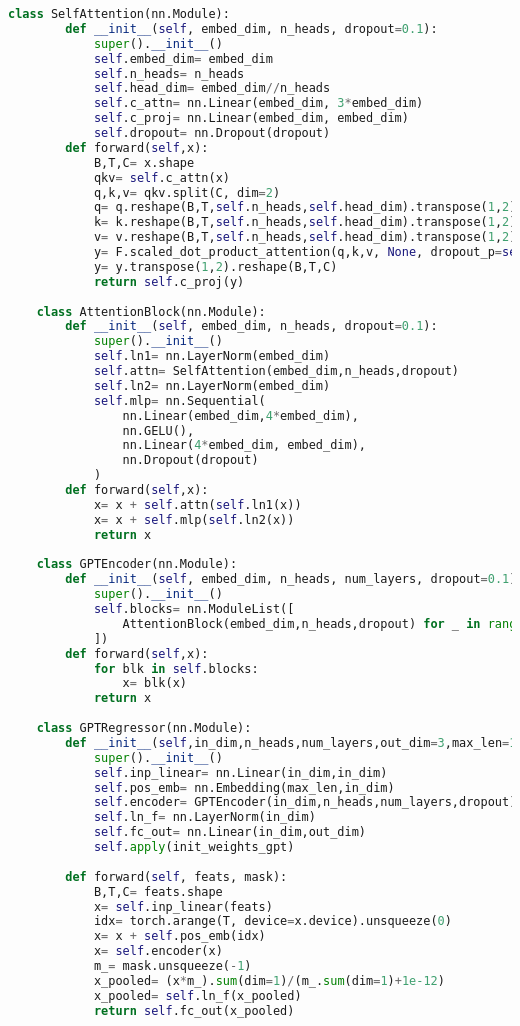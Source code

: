 \begin{lstlisting}[language=Python, caption={模型训练、验证与测试对比脚本 (train\_val\_test\_compare\_v1.py)}, label={lst:train_script}]
    class SelfAttention(nn.Module):
        def __init__(self, embed_dim, n_heads, dropout=0.1):
            super().__init__()
            self.embed_dim= embed_dim
            self.n_heads= n_heads
            self.head_dim= embed_dim//n_heads
            self.c_attn= nn.Linear(embed_dim, 3*embed_dim)
            self.c_proj= nn.Linear(embed_dim, embed_dim)
            self.dropout= nn.Dropout(dropout)
        def forward(self,x):
            B,T,C= x.shape
            qkv= self.c_attn(x)
            q,k,v= qkv.split(C, dim=2)
            q= q.reshape(B,T,self.n_heads,self.head_dim).transpose(1,2)
            k= k.reshape(B,T,self.n_heads,self.head_dim).transpose(1,2)
            v= v.reshape(B,T,self.n_heads,self.head_dim).transpose(1,2)
            y= F.scaled_dot_product_attention(q,k,v, None, dropout_p=self.dropout.p)
            y= y.transpose(1,2).reshape(B,T,C)
            return self.c_proj(y)
    
    class AttentionBlock(nn.Module):
        def __init__(self, embed_dim, n_heads, dropout=0.1):
            super().__init__()
            self.ln1= nn.LayerNorm(embed_dim)
            self.attn= SelfAttention(embed_dim,n_heads,dropout)
            self.ln2= nn.LayerNorm(embed_dim)
            self.mlp= nn.Sequential(
                nn.Linear(embed_dim,4*embed_dim),
                nn.GELU(),
                nn.Linear(4*embed_dim, embed_dim),
                nn.Dropout(dropout)
            )
        def forward(self,x):
            x= x + self.attn(self.ln1(x))
            x= x + self.mlp(self.ln2(x))
            return x
    
    class GPTEncoder(nn.Module):
        def __init__(self, embed_dim, n_heads, num_layers, dropout=0.1):
            super().__init__()
            self.blocks= nn.ModuleList([
                AttentionBlock(embed_dim,n_heads,dropout) for _ in range(num_layers)
            ])
        def forward(self,x):
            for blk in self.blocks:
                x= blk(x)
            return x
    
    class GPTRegressor(nn.Module):
        def __init__(self,in_dim,n_heads,num_layers,out_dim=3,max_len=1000,dropout=0.1):
            super().__init__()
            self.inp_linear= nn.Linear(in_dim,in_dim)
            self.pos_emb= nn.Embedding(max_len,in_dim)
            self.encoder= GPTEncoder(in_dim,n_heads,num_layers,dropout)
            self.ln_f= nn.LayerNorm(in_dim)
            self.fc_out= nn.Linear(in_dim,out_dim)
            self.apply(init_weights_gpt)
    
        def forward(self, feats, mask):
            B,T,C= feats.shape
            x= self.inp_linear(feats)
            idx= torch.arange(T, device=x.device).unsqueeze(0)
            x= x + self.pos_emb(idx)
            x= self.encoder(x)
            m_= mask.unsqueeze(-1)
            x_pooled= (x*m_).sum(dim=1)/(m_.sum(dim=1)+1e-12)
            x_pooled= self.ln_f(x_pooled)
            return self.fc_out(x_pooled)
    

\end{lstlisting}
